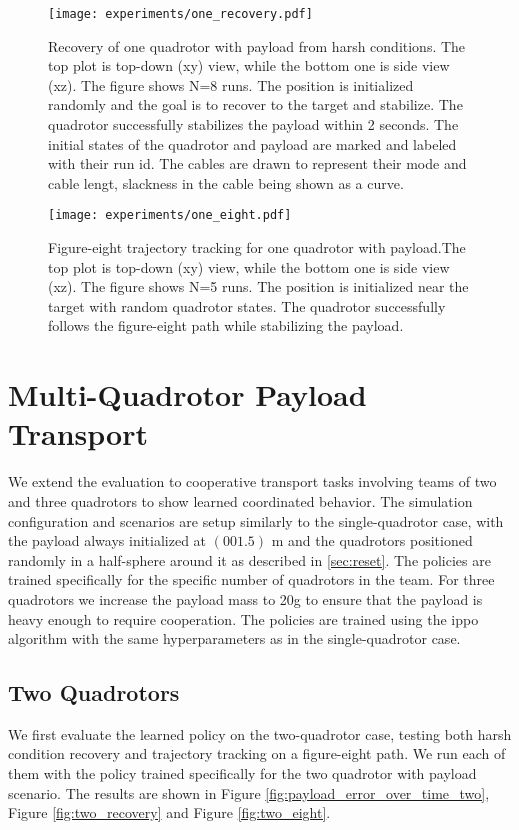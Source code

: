 \begin{figure}[ht]
    \centering
    
    \texttt{[image: experiments/one\_recovery.pdf]}
    \caption{Recovery of one quadrotor with payload from harsh conditions. The top plot is top-down  (xy) view, while the bottom one is side view (xz).
    The figure shows N=8 runs. The position is initialized randomly and the goal is to recover to the target and stabilize. The quadrotor successfully stabilizes the payload within 2 seconds. The initial states of the quadrotor and payload are marked and labeled with their run id. The cables are drawn to represent their mode and cable lengt, slackness in the cable being shown as a curve.}
    \label{fig:one_recovery}
\end{figure}
\begin{figure}[ht]
    \centering
    
    \texttt{[image: experiments/one\_eight.pdf]}
    \caption{Figure-eight trajectory tracking for one quadrotor with payload.The top plot is top-down  (xy) view, while the bottom one is side view (xz). The figure shows N=5 runs. The position is initialized near the target with random quadrotor states. The quadrotor successfully follows the figure-eight path while stabilizing the payload.}
    \label{fig:one_eight}
\end{figure}

\section{Multi-Quadrotor Payload Transport}
We extend the evaluation to cooperative transport tasks involving teams of two and three quadrotors to show learned coordinated behavior. The simulation configuration and scenarios are setup similarly to the single-quadrotor case, with the payload always initialized at $(0 0 1.5)$ m and the quadrotors positioned randomly in a half-sphere around it as described in \ref{sec:reset}. The policies are trained specifically for the specific number of quadrotors in the team. For three quadrotors we increase the payload mass to 20g to ensure that the payload is heavy enough to require cooperation. The policies are trained using the \gls{ippo} algorithm with the same hyperparameters as in the single-quadrotor case.
\subsection{Two Quadrotors}
We first evaluate the learned policy on the two-quadrotor case, testing both harsh condition recovery and trajectory tracking on a figure-eight path. We run each of them with the policy trained specifically for the two quadrotor with payload scenario. The results are shown in Figure \ref{fig:payload_error_over_time_two}, Figure \ref{fig:two_recovery} and Figure \ref{fig:two_eight}.

